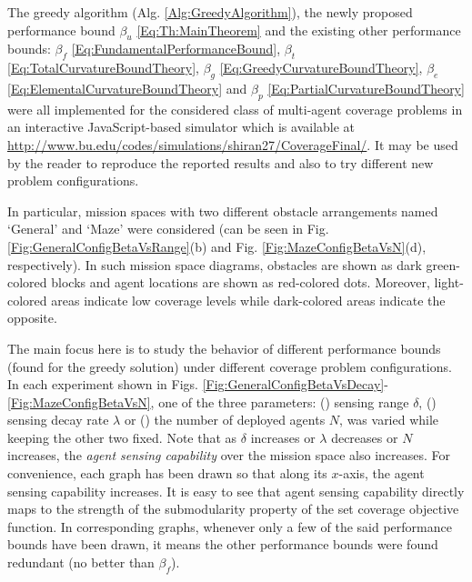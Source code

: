 \documentclass[conference]{IEEEtran}
\begin{document}
The greedy algorithm (Alg. \ref{Alg:GreedyAlgorithm}), the newly proposed performance bound $\beta_u$ \eqref{Eq:Th:MainTheorem} and the existing other performance bounds: $\beta_f$ \eqref{Eq:FundamentalPerformanceBound}, $\beta_t$ \eqref{Eq:TotalCurvatureBoundTheory}, $\beta_g$ \eqref{Eq:GreedyCurvatureBoundTheory}, $\beta_e$ \eqref{Eq:ElementalCurvatureBoundTheory} and $\beta_p$ \eqref{Eq:PartialCurvatureBoundTheory} were all implemented for the considered class of multi-agent coverage problems in an interactive JavaScript-based simulator which is available at \url{http://www.bu.edu/codes/simulations/shiran27/CoverageFinal/}. It may be used by the reader to reproduce the reported results and also to try different new problem configurations. 


In particular, mission spaces with two different obstacle arrangements named `General' and `Maze' were considered (can be seen in Fig. \ref{Fig:GeneralConfigBetaVsRange}(b) and Fig. \ref{Fig:MazeConfigBetaVsN}(d), respectively). In such mission space diagrams, obstacles are shown as dark green-colored blocks and agent locations are shown as red-colored dots. Moreover, light-colored areas indicate low coverage levels while dark-colored areas indicate the opposite.


The main focus here is to study the behavior of different performance bounds (found for the greedy solution) under different coverage problem configurations. In each experiment shown in Figs. \ref{Fig:GeneralConfigBetaVsDecay}-\ref{Fig:MazeConfigBetaVsN}, one of the three parameters: () sensing range $\delta$, () sensing decay rate $\lambda$ or () the number of deployed agents $N$, was varied while keeping the other two fixed. Note that as $\delta$ increases or $\lambda$ decreases or $N$ increases, the \emph{agent sensing capability} over the mission space also increases. For convenience, each graph has been drawn so that along its $x$-axis, the agent sensing capability increases. It is easy to see that agent sensing capability directly maps to the strength of the submodularity property of the set coverage objective function. In corresponding graphs, whenever only a few of the said performance bounds have been drawn, it means the other performance bounds were found redundant (no better than $\beta_f$). 
\end{document}
